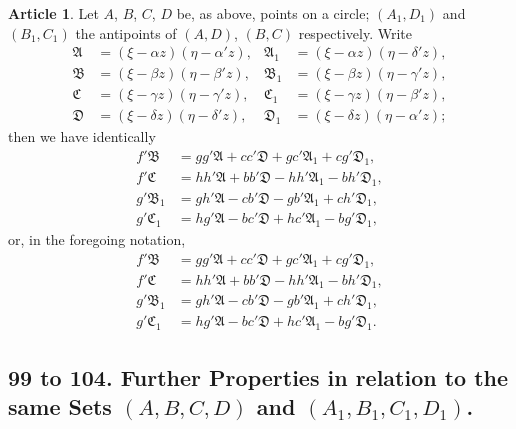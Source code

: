\documentclass[11pt,a4paper]{article}
\theoremstyle{definition}
\newtheorem{art}{Article}
\begin{document}
\begin{art}
Let $A$, $B$, $C$, $D$ be, as above, points on a circle; $(A_{1}, D_{1})$ and $(B_{1}, C_{1})$ the antipoints of $(A, D)$, $(B, C)$ respectively. Write
\begin{align*}
\mathfrak{A} &= (\xi - \alpha z)(\eta - \alpha' z), & \mathfrak{A}_{1} &= (\xi - \alpha z)(\eta - \delta' z), \\
\mathfrak{B} &= (\xi - \beta z)(\eta - \beta' z), & \mathfrak{B}_{1} &= (\xi - \beta z)(\eta - \gamma' z), \\
\mathfrak{C} &= (\xi - \gamma z)(\eta - \gamma' z), & \mathfrak{C}_{1} &= (\xi - \gamma z)(\eta - \beta' z), \\
\mathfrak{D} &= (\xi - \delta z)(\eta - \delta' z), & \mathfrak{D}_{1} &= (\xi - \delta z)(\eta - \alpha' z);
\end{align*}
then we have identically
\begin{align*}
f'\mathfrak{B} &= gg'\mathfrak{A} + cc'\mathfrak{D} + gc'\mathfrak{A}_{1} + cg'\mathfrak{D}_{1}, \\
f'\mathfrak{C} &= hh'\mathfrak{A} + bb'\mathfrak{D} - hh'\mathfrak{A}_{1} - bh'\mathfrak{D}_{1}, \\
g'\mathfrak{B}_{1} &= gh'\mathfrak{A} - cb'\mathfrak{D} - gb'\mathfrak{A}_{1} + ch'\mathfrak{D}_{1}, \\
g'\mathfrak{C}_{1} &= hg'\mathfrak{A} - bc'\mathfrak{D} + hc'\mathfrak{A}_{1} - bg'\mathfrak{D}_{1},
\end{align*}
or, in the foregoing notation,
\begin{align*}
f'\mathfrak{B} &= gg'\mathfrak{A} + cc'\mathfrak{D} + gc'\mathfrak{A}_{1} + cg'\mathfrak{D}_{1}, \\
f'\mathfrak{C} &= hh'\mathfrak{A} + bb'\mathfrak{D} - hh'\mathfrak{A}_{1} - bh'\mathfrak{D}_{1}, \\
g'\mathfrak{B}_{1} &= gh'\mathfrak{A} - cb'\mathfrak{D} - gb'\mathfrak{A}_{1} + ch'\mathfrak{D}_{1}, \\
g'\mathfrak{C}_{1} &= hg'\mathfrak{A} - bc'\mathfrak{D} + hc'\mathfrak{A}_{1} - bg'\mathfrak{D}_{1}.
\end{align*}
\end{art}

\subsection{99 to 104. Further Properties in relation to the same Sets $(A, B, C, D)$ and $(A_{1}, B_{1}, C_{1}, D_{1})$.}
\end{document}
